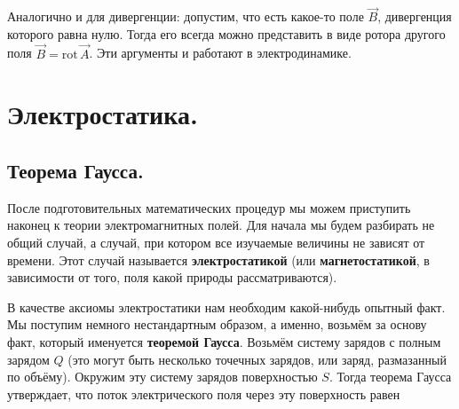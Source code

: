 \documentclass[11pt,a4paper]{article}
\numberwithin{equation}{section}
\newcommand{\pt}{\partial}
\newcommand{\rot}{\mathrm{rot}\,}
\newcommand{\vn}{\vec{\nabla}}
\begin{document}
Аналогично и для дивергенции: допустим, что есть какое-то поле $\vec{B}$,
дивергенция которого равна нулю. Тогда его всегда можно представить в
виде ротора другого поля $\vec{B} =\rot \vec{A}$. Эти аргументы и работают
в электродинамике. 






\section{Электростатика.}
\label{sec:statics}

\subsection{Теорема Гаусса.}
\label{sec:coulomb}

После подготовительных математических процедур мы можем приступить
наконец к теории электромагнитных полей. Для начала мы будем разбирать
не общий случай, а случай, при котором все изучаемые величины не
зависят от времени. Этот случай называется \textbf{электростатикой} (или
\textbf{магнетостатикой}, в зависимости от того, поля какой природы
рассматриваются). 

В качестве аксиомы электростатики нам необходим какой-нибудь опытный
факт. Мы поступим немного нестандартным образом, а именно, возьмём за
основу факт, который именуется \textbf{теоремой Гаусса}. Возьмём
систему зарядов с полным зарядом $Q$ (это могут быть несколько
точечных зарядов, или заряд, размазанный по объёму). Окружим эту
систему зарядов поверхностью $S$. Тогда теорема Гаусса утверждает, что
поток электрического поля через эту поверхность равен
\end{document}
